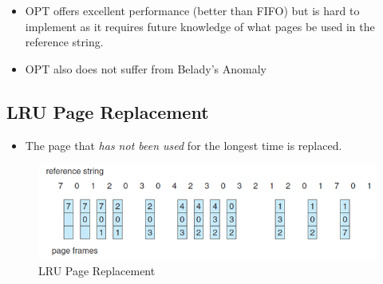 \documentclass{article}
\theoremstyle{plain}
\theoremstyle{definition}
\begin{document}
\begin{itemize}
    \item OPT offers excellent performance (better than FIFO) but is hard to implement as it requires future knowledge of what pages be used in the reference string. 
    
    \item OPT also does not suffer from Belady's Anomaly
\end{itemize}

\subsection{LRU Page Replacement}
\begin{itemize}
    \item The page that \textit{has not been used} for the longest time is replaced.
\end{itemize}
\begin{figure}[!h]
    \centering
    \includegraphics[scale=0.8]{os13.png}
    \caption{LRU Page Replacement}
    \label{fig:my_label_13}
\end{figure}
\end{document}
